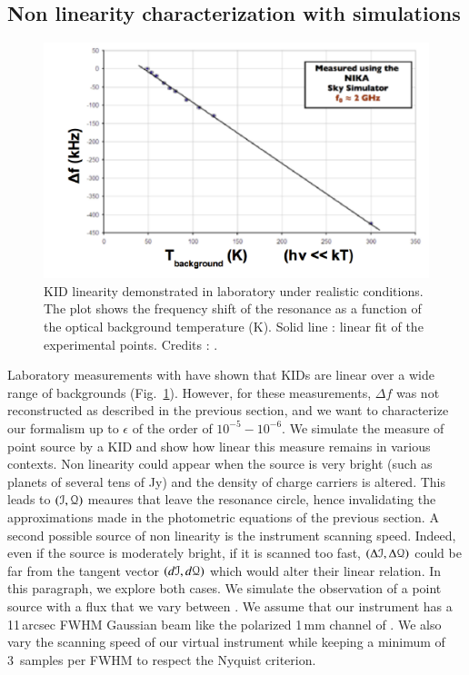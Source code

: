
{\color{blue} 
\subsection{Non linearity characterization with simulations}

\begin{figure}
\center
\includegraphics[clip, angle=0, width=\columnwidth]{Figures/KID-linearity-Monfardini2014.png}
\caption{KID linearity demonstrated in laboratory under realistic
  conditions. The plot shows the frequency shift of the resonance as a function
  of the optical background temperature (K). Solid line : linear fit of the
  experimental points. Credits : \citet{2014JLTP..176..787M}.}
\label{fig:KID-lin}
\end{figure}

Laboratory measurements with  have shown that
KIDs are linear over a wide range of backgrounds
(Fig.~\ref{fig:KID-lin}). However, for these measurements, $\Delta f$ was not
reconstructed as described in the previous section, and we want to characterize
our formalism up to $\epsilon$ of the order of $10^{-5}-10^{-6}$. We simulate
the measure of point source by a KID and show how linear this measure remains in
various contexts. Non linearity could appear when the source is very bright
(such as planets of several tens of Jy) and the density of charge carriers is
altered. This leads to $(\mathcal{I},\mathcal{Q})$ meaures that leave the resonance circle, hence
invalidating the approximations made in the photometric equations of the
previous section. A second possible source of non linearity is the instrument
scanning speed. Indeed, even if the source is moderately bright, if it is
scanned too fast, $(\Delta\mathcal{I},\Delta\mathcal{Q})$ could be far from the tangent vector
$(d\mathcal{I},d\mathcal{Q})$ which would alter their linear relation. In this paragraph, we
explore both cases. We simulate the observation of a point source with a flux
that we vary between . We assume that our instrument has
a 11\,arcsec FWHM Gaussian beam like the polarized 1\,mm channel of \nikad. We
also vary the scanning speed of our virtual instrument while keeping a minimum
of 3~samples per FWHM to respect the Nyquist criterion.

}
